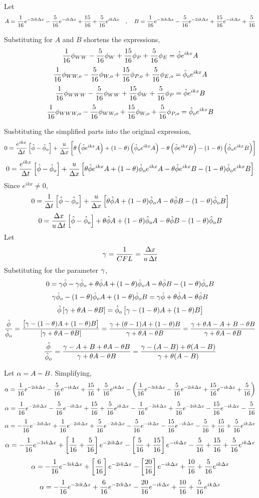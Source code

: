 \documentclass[class=report, 12pt, crop=false]{standalone}
\begin{document}
\begin{center}
Let$$A = \frac{1}{16}e^{-2ik\Delta x} - \frac{5}{16}e^{-ik\Delta x} + \frac{15}{16} + \frac{5}{16}e^{ik\Delta x} \quad,\quad B = \frac{1}{16}e^{-3ik\Delta x} - \frac{5}{16}e^{-2ik\Delta x} + \frac{15}{16}e^{-ik\Delta x} + \frac{5}{16}$$

Substituting for $A$ and $B$ shortens the expressions,
$$\frac{1}{16}\phi_{WW} - \frac{5}{16}\phi_{W} + \frac{15}{16}\phi_{P} + \frac{5}{16}\phi_{E} = \hat{\phi}e^{ikx}A$$
$$\frac{1}{16}\phi_{WW,o} - \frac{5}{16}\phi_{W,o} + \frac{15}{16}\phi_{P,o} + \frac{5}{16}\phi_{E,o} = \hat{\phi}_oe^{ikx}A$$
$$\frac{1}{16}\phi_{WWW} - \frac{5}{16}\phi_{WW} + \frac{15}{16}\phi_{W} + \frac{5}{16}\phi_{P} = \hat{\phi}e^{ikx}B$$
$$\frac{1}{16}\phi_{WWW,o} - \frac{5}{16}\phi_{WW,o} + \frac{15}{16}\phi_{W,o} + \frac{5}{16}\phi_{P,o} = \hat{\phi}_oe^{ikx}B$$

Susbtituting the simplified parts into the original expression,
$$0 = \frac{e^{ikx}}{\Delta t}\left[\hat{\phi} - \hat{\phi}_o\right] + \frac{u}{\Delta x}\left[\theta\left(\hat{\phi}e^{ikx}A\right) + (1-\theta)\left(\hat{\phi}_oe^{ikx}A\right) - \theta\left(\hat{\phi}e^{ikx}B\right) - (1-\theta)\left(\hat{\phi}_oe^{ikx}B\right)\right]$$
$$0 = \frac{e^{ikx}}{\Delta t}\left[\hat{\phi} - \hat{\phi}_o\right] + \frac{u}{\Delta x}\left[\theta\hat{\phi}e^{ikx}A + (1-\theta)\hat{\phi}_oe^{ikx}A - \theta\hat{\phi}e^{ikx}B - (1-\theta)\hat{\phi}_oe^{ikx}B\right]$$
Since $e^{ikx}\neq 0$,
$$0 = \frac{1}{\Delta t}\left[\hat{\phi} - \hat{\phi}_o\right] + \frac{u}{\Delta x}\left[\theta\hat{\phi}A + (1-\theta)\hat{\phi}_oA - \theta\hat{\phi}B - (1-\theta)\hat{\phi}_oB\right]$$
$$0 = \frac{\Delta x}{u\,\Delta t}\left[\hat{\phi} - \hat{\phi}_o\right] + \theta\hat{\phi}A + (1-\theta)\hat{\phi}_oA - \theta\hat{\phi}B - (1-\theta)\hat{\phi}_oB$$
Let 
$$\gamma = \frac{1}{CFL} = \frac{\Delta x}{u\,\Delta t}$$
Substituting for the parameter $\gamma$,
$$0 = \gamma\hat{\phi} - \gamma\hat{\phi}_o + \theta\hat{\phi}A + (1-\theta)\hat{\phi}_oA - \theta\hat{\phi}B - (1-\theta)\hat{\phi}_oB$$
$$\gamma\hat{\phi}_o - (1-\theta)\hat{\phi}_oA + (1-\theta)\hat{\phi}_oB = \gamma\hat{\phi} + \theta\hat{\phi}A - \theta\hat{\phi}B$$
$$\hat{\phi}\left[\gamma + \theta A - \theta B\right] = \hat{\phi}_o\left[\gamma - (1-\theta)A + (1-\theta)B\right]$$
$$\frac{\hat{\phi}}{\hat{\phi}_o} = \frac{\left[\gamma - (1-\theta)A + (1-\theta)B\right]}{\left[\gamma + \theta A - \theta B\right]} = \frac{\gamma + (\theta-1)A + (1-\theta)B}{\gamma + \theta A - \theta B} = \frac{\gamma + \theta A - A + B-\theta B}{\gamma + \theta A - \theta B}$$
$$\frac{\hat{\phi}}{\hat{\phi}_o} = \frac{\gamma - A + B + \theta A - \theta B}{\gamma + \theta A - \theta B} = \frac{\gamma - (A - B) + \theta(A - B)}{\gamma + \theta(A - B)}$$

Let $\alpha = A-B$. Simplifying,
$$\alpha = \frac{1}{16}e^{-2ik\Delta x} - \frac{5}{16}e^{-ik\Delta x} + \frac{15}{16} + \frac{5}{16}e^{ik\Delta x} - \left(\frac{1}{16}e^{-3ik\Delta x} - \frac{5}{16}e^{-2ik\Delta x} + \frac{15}{16}e^{-ik\Delta x} + \frac{5}{16}\right)$$
$$\alpha = \frac{1}{16}e^{-2ik\Delta x} - \frac{5}{16}e^{-ik\Delta x} + \frac{15}{16} + \frac{5}{16}e^{ik\Delta x} - \frac{1}{16}e^{-3ik\Delta x} + \frac{5}{16}e^{-2ik\Delta x} - \frac{15}{16}e^{-ik\Delta x} - \frac{5}{16}$$
$$\alpha = - \frac{1}{16}e^{-3ik\Delta x} + \frac{1}{16}e^{-2ik\Delta x} + \frac{5}{16}e^{-2ik\Delta x} - \frac{5}{16}e^{-ik\Delta x} - \frac{15}{16}e^{-ik\Delta x} - \frac{5}{16} + \frac{15}{16} + \frac{5}{16}e^{ik\Delta x}$$
$$\alpha = - \frac{1}{16}e^{-3ik\Delta x} + \left[\frac{1}{16} + \frac{5}{16}\right]e^{-2ik\Delta x} - \left[\frac{5}{16} + \frac{15}{16}\right]e^{-ik\Delta x}  - \frac{5}{16} + \frac{15}{16} + \frac{5}{16}e^{ik\Delta x}$$
$$\alpha = - \frac{1}{16}e^{-3ik\Delta x} + \left[\frac{6}{16}\right]e^{-2ik\Delta x} - \left[\frac{20}{16}\right]e^{-ik\Delta x} + \frac{10}{16} + \frac{5}{16}e^{ik\Delta x}$$
$$\alpha = - \frac{1}{16}e^{-3ik\Delta x} + \frac{6}{16}e^{-2ik\Delta x} - \frac{20}{16}e^{-ik\Delta x} + \frac{10}{16} + \frac{5}{16}e^{ik\Delta x}$$


\end{center}
\end{document}
